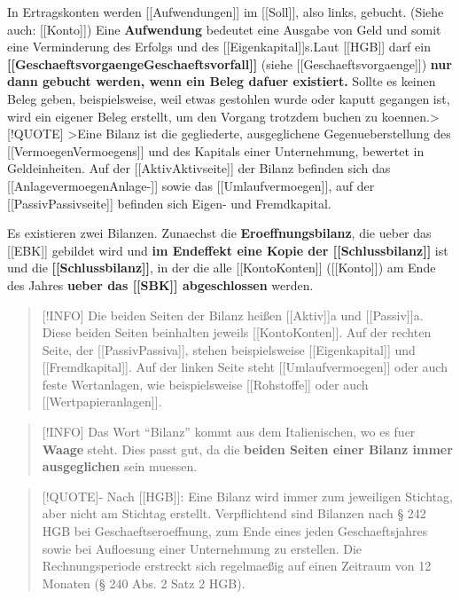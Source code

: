 In Ertragskonten werden {[}{[}Aufwendungen{]}{]} im {[}{[}Soll{]}{]},
also links, gebucht. (Siehe auch: {[}{[}Konto{]}{]}) Eine
\textbf{Aufwendung} bedeutet eine Ausgabe von Geld und somit eine
Verminderung des Erfolgs und des {[}{[}Eigenkapital{]}{]}s.Laut
{[}{[}HGB{]}{]} darf ein
\textbf{{[}{[}Geschaeftsvorgaenge\textbar Geschaeftsvorfall{]}{]}} (siehe
{[}{[}Geschaeftsvorgaenge{]}{]}) \textbf{nur dann gebucht werden, wenn ein
Beleg dafuer existiert.} Sollte es keinen Beleg geben, beispielsweise,
weil etwas gestohlen wurde oder kaputt gegangen ist, wird ein eigener
Beleg erstellt, um den Vorgang trotzdem buchen zu
koennen.\textgreater{[}!QUOTE{]} \textgreater Eine Bilanz ist die
gegliederte, ausgeglichene Gegenueberstellung des
{[}{[}Vermoegen\textbar Vermoegens{]}{]} und des Kapitals einer
Unternehmung, bewertet in Geldeinheiten. Auf der
{[}{[}Aktiv\textbar Aktivseite{]}{]} der Bilanz befinden sich das
{[}{[}Anlagevermoegen\textbar Anlage-{]}{]} sowie das
{[}{[}Umlaufvermoegen{]}{]}, auf der
{[}{[}Passiv\textbar Passivseite{]}{]} befinden sich Eigen- und
Fremdkapital.

Es existieren zwei Bilanzen. Zunaechst die \textbf{Eroeffnungsbilanz}, die
ueber das {[}{[}EBK{]}{]} gebildet wird und \textbf{im Endeffekt eine
Kopie der {[}{[}Schlussbilanz{]}{]}} ist und die
\textbf{{[}{[}Schlussbilanz{]}{]}}, in der die alle
{[}{[}Konto\textbar Konten{]}{]} ({[}{[}Konto{]}{]}) am Ende des Jahres
\textbf{ueber das {[}{[}SBK{]}{]} abgeschlossen} werden.

\begin{quote}
{[}!INFO{]} Die beiden Seiten der Bilanz heißen {[}{[}Aktiv{]}{]}a und
{[}{[}Passiv{]}{]}a. Diese beiden Seiten beinhalten jeweils
{[}{[}Konto\textbar Konten{]}{]}. Auf der rechten Seite, der
{[}{[}Passiv\textbar Passiva{]}{]}, stehen beispielsweise
{[}{[}Eigenkapital{]}{]} und {[}{[}Fremdkapital{]}{]}. Auf der linken
Seite steht {[}{[}Umlaufvermoegen{]}{]} oder auch feste Wertanlagen, wie
beispielsweise {[}{[}Rohstoffe{]}{]} oder auch
{[}{[}Wertpapieranlagen{]}{]}.
\end{quote}

\begin{quote}
{[}!INFO{]} Das Wort ``Bilanz'' kommt aus dem Italienischen, wo es fuer
\textbf{Waage} steht. Dies passt gut, da die \textbf{beiden Seiten einer
Bilanz immer ausgeglichen} sein muessen.
\end{quote}

\begin{quote}
{[}!QUOTE{]}- Nach {[}{[}HGB{]}{]}: Eine Bilanz wird immer zum
jeweiligen Stichtag, aber nicht am Stichtag erstellt. Verpflichtend sind
Bilanzen nach § 242 HGB bei Geschaeftseroeffnung, zum Ende eines jeden
Geschaeftsjahres sowie bei Aufloesung einer Unternehmung zu erstellen. Die
Rechnungsperiode erstreckt sich regelmaeßig auf einen Zeitraum von 12
Monaten (§ 240 Abs. 2 Satz 2 HGB).
\end{quote}

